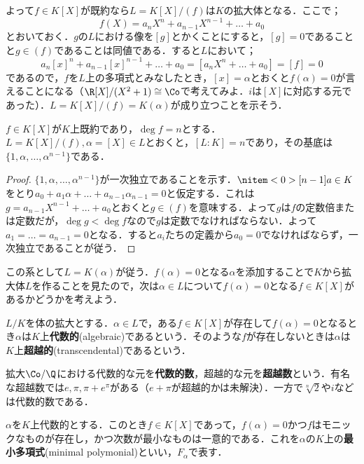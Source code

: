 よって$f\in K[X]$が既約なら$L=K[X]/(f)$は$K$の拡大体となる．ここで；
\[f(X)=a_nX^n+a_{n-1}X^{n-1}+\dots+a_0\]
とおいておく．$g$の$L$における像を$[g]$とかくことにすると，$[g]=0$であることと$g\in (f)$であることは同値である．すると$L$において；
\[a_n[x]^n+a_{n-1}[x]^{n-1}+\dots+a_0=[a_nX^n+\dots+a_0]=[f]=0\]
であるので，$f$を$L$上の多項式とみなしたとき，$[x]=\alpha$とおくと$f(\alpha)=0$が言えることになる（$\R[X]/(X^2+1)\cong\Co$で考えてみよ．$i$は$[X]$に対応する元であった）．$L=K[X]/(f)=K(\alpha)$が成り立つことを示そう．

\begin{prop}\label{prop:既約多項式の商による拡大}
	$f\in K[X]$が$K$上既約であり，$\deg f=n$とする．$L=K[X]/(f),\alpha=[X]\in L$とおくと，$[L:K]=n$であり，その基底は$\{1,\alpha,\dots,\alpha^{n-1}\}$である．
\end{prop}

\begin{proof}
	$\{1,\alpha,\dots,\alpha^{n-1}\}$が一次独立であることを示す．$\nitem<0>[n-1]{a}\in K$をとり$a_0+a_1\alpha+\dots+a_{n-1}\alpha_{n-1}=0$と仮定する．これは$g=a_{n-1}X^{n-1}+\dots+a_0$とおくと$g\in (f)$を意味する．よって$g$は$f$の定数倍または定数だが，$\deg g<\deg f$なので$g$は定数でなければならない．よって$a_1=\dots=a_{n-1}=0$となる．すると$a_i$たちの定義から$a_0=0$でなければならず，一次独立であることが従う．
\end{proof}

この系として$L= K(\alpha)$が従う．$f(\alpha)=0$となる$\alpha$を添加することで$K$から拡大体$L$を作ることを見たので，次は$\alpha\in L$について$f(\alpha)=0$となる$f\in K[X]$があるかどうかを考えよう．

\begin{defi}[代数的]
	$L/K$を体の拡大とする．$\alpha\in L$で，ある$f\in K[X]$が存在して$f(\alpha)=0$となるとき$\alpha$は$K$上\textbf{代数的}(algebraic)であるという．そのような$f$が存在しないときは$\alpha$は$K$上\textbf{超越的}(transcendental)であるという．
\end{defi}

拡大$\Co/\Q$における代数的な元を\textbf{代数的数}，超越的な元を\textbf{超越数}という．有名な超越数では$e,\pi,\pi+e^\pi$がある（$e+\pi$が超越的かは未解決）．一方で$\sqrt[n]{2}$や$i$などは代数的数である．

\begin{defi}[最小多項式]
	$\alpha$を$K$上代数的とする．このとき$f\in K[X]$であって，$f(\alpha)=0$かつ$f$はモニックなものが存在し，かつ次数が最小なものは一意的である．これを$\alpha$の$K$上の\textbf{最小多項式}(minimal polymonial)といい，$F_\alpha$で表す．
\end{defi}

